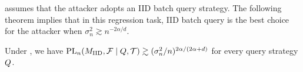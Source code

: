     
    

     assumes that the attacker adopts an IID batch query strategy. 
    The following theorem implies that in this regression task, IID batch query is the best choice for the attacker when $\sigma_n^2 \gtrsim n^{-2\alpha/d}$.
    
        \begin{theorem}\label{thm:IIDquery}
         Under , we have $\textrm{PL}_n(M_{\textrm{IID}},\mathcal{F}\mid Q,\mathcal{T}) \gtrsim (\sigma_n^2/n)^{2\alpha/(2\alpha+d)}$ for every query strategy $Q$. 
        \end{theorem}    
        


        
